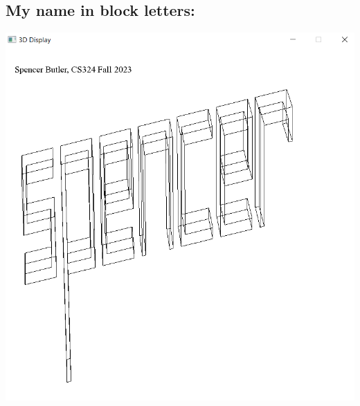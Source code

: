 \documentclass[12pt]{article}
\begin{document}
\subsection{My name in block letters:}
\noindent \includegraphics{img/5}
\end{document}
